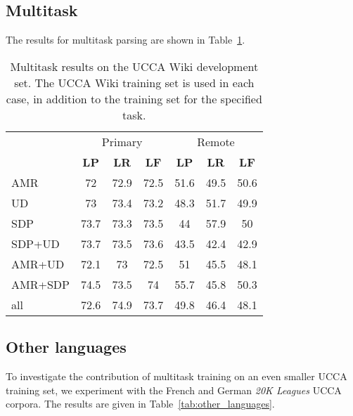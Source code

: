 \documentclass[11pt,a4paper]{article}
\begin{document}
\subsection{Multitask}\label{sec:results_multi}

The results for multitask parsing are shown in Table~\ref{tab:multi}.

\begin{table}
\begin{tabular}{lccc|ccc}
& \multicolumn{3}{c|}{Primary} & \multicolumn{3}{c}{Remote} \\
& \textbf{LP} & \textbf{LR} & \textbf{LF} & \textbf{LP} & \textbf{LR} & \textbf{LF} \\
\small AMR & 72 & 72.9 & 72.5 & 51.6 & 49.5 & 50.6 \\
\small UD & 73 & 73.4 & 73.2 & 48.3 & 51.7 & 49.9 \\
\small SDP & 73.7 & 73.3 & 73.5 & 44 & 57.9 & 50 \\
\small SDP+UD & 73.7 & 73.5 & 73.6 & 43.5 & 42.4 & 42.9 \\
\small AMR+UD & 72.1 & 73 & 72.5 & 51 & 45.5 & 48.1 \\
\small AMR+SDP & 74.5 & 73.5 & 74 & 55.7 & 45.8 & 50.3 \\
\small all & 72.6 & 74.9 & 73.7 & 49.8 & 46.4 & 48.1
\end{tabular}
\caption{Multitask results on the UCCA Wiki development set.
The UCCA Wiki training set is used in each case, in addition to the training
set for the specified task.\label{tab:multi}}
\end{table}


\subsection{Other languages}\label{sec:other_languages}

To investigate the contribution of multitask training on an even smaller UCCA training set,
we experiment with the French and German \textit{20K Leagues} UCCA corpora.
The results are given in Table~\ref{tab:other_languages}.
\end{document}
